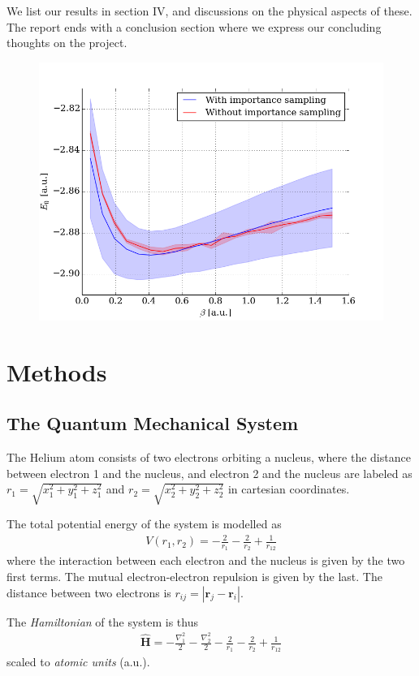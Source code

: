 \documentclass[twocolumns, a4paper,10pt,fleqn]{extarticle}
\newcommand{\eq}[1]{{\small\begin{align*}#1\end{align*}}}
\renewcommand\vec[1]{\boldsymbol{\mathbf{#1}}}
\newcommand{\OP}[1]{\mathbf{\widehat{#1}}}
\begin{document}
We list our results in section IV, and discussions on the physical aspects of these.
The report ends with a conclusion section where we express our concluding thoughts
on the project.

\begin{figure}[h!]
	\includegraphics[width=\columnwidth]{../res/plot/helium_01/helium_01_pretty.png}
	\caption{}\label{fig:1}
\end{figure}

\section{Methods}
\subsection{The Quantum Mechanical System}
The Helium atom consists of two electrons orbiting a nucleus,
where the distance between electron 1 and the nucleus,
and electron 2 and the nucleus are labeled as
$r_1 = \sqrt{x_1^2 + y_1^2 + z_1^2}$ 
and $r_2 = \sqrt{x_2^2 + y_2^2 + z_2^2}$ in cartesian coordinates.

The total potential energy of the system is modelled as
{\small
\eq{
    V(r_1,r_2)=-\frac{2}{r_1}-\frac{2}{r_2}+\frac{1}{r_{12}}
}}%
where the interaction between each electron and the nucleus
is given by the two first terms. 
The mutual electron-electron repulsion is given by the last.
The distance between two electrons is $r_{ij}=|\vec r_j-\vec r_i|$.

The \textit{Hamiltonian} of the system is thus
\eq{
    \OP H = -\frac{\nabla_1 ^2}{2} -\frac{\nabla_2 ^2}{2}
    -\frac{2}{r_1}-\frac{2}{r_2}+\frac{1}{r_{12}}
}
scaled to \textit{atomic units} (a.u.).
\end{document}
